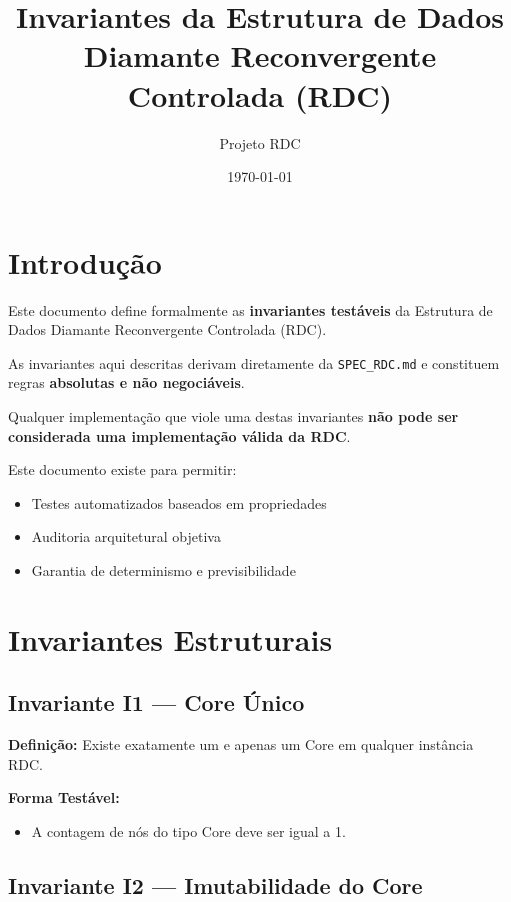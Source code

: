 \documentclass[12pt,a4paper]{article}
\title{Invariantes da Estrutura de Dados Diamante Reconvergente Controlada (RDC)}
\author{Projeto RDC}
\date{\today}
\begin{document}
	\maketitle
	
	\section{Introdução}
	
	Este documento define formalmente as \textbf{invariantes testáveis} da Estrutura de
	Dados Diamante Reconvergente Controlada (RDC).
	
	As invariantes aqui descritas derivam diretamente da
	\texttt{SPEC\_RDC.md} e constituem regras
	\textbf{absolutas e não negociáveis}.
	
	Qualquer implementação que viole uma destas invariantes
	\textbf{não pode ser considerada uma implementação válida da RDC}.
	
	Este documento existe para permitir:
	
	\begin{itemize}[leftmargin=2em]
		\item Testes automatizados baseados em propriedades
		\item Auditoria arquitetural objetiva
		\item Garantia de determinismo e previsibilidade
	\end{itemize}
	
	\section{Invariantes Estruturais}
	
	\subsection{Invariante I1 — Core Único}
	
	\textbf{Definição:}  
	Existe exatamente um e apenas um Core em qualquer instância RDC.
	
	\textbf{Forma Testável:}
	\begin{itemize}
		\item A contagem de nós do tipo Core deve ser igual a 1.
	\end{itemize}
	
	\subsection{Invariante I2 — Imutabilidade do Core}
	
\end{document}
